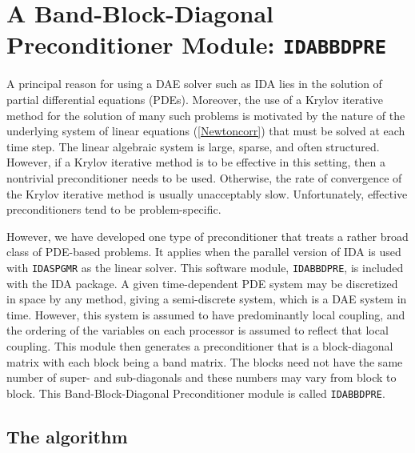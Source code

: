 \section{A Band-Block-Diagonal Preconditioner Module: {\tt IDABBDPRE}}

A principal reason for using a DAE solver such as IDA lies in the
solution of partial differential equations (PDEs).  Moreover, the use
of a Krylov iterative method for the solution of many such problems is
motivated by the nature of the underlying system of linear equations
(\ref{Newtoncorr}) that must be solved at each time step.  The linear
algebraic system is large, sparse, and often structured. However, if a
Krylov iterative method is to be effective in this setting, then a
nontrivial preconditioner needs to be used.  Otherwise, the rate of
convergence of the Krylov iterative method is usually unacceptably
slow.  Unfortunately, effective preconditioners tend to be
problem-specific.

However, we have developed one type of preconditioner that treats a
rather broad class of PDE-based problems.  It applies when the
parallel version of IDA is used with {\tt IDASPGMR} as the linear
solver. This software module, {\tt IDABBDPRE}, is included with the IDA 
package. A given time-dependent PDE system may be discretized in space by any
method, giving a semi-discrete system, which is a DAE system in time.
However, this system is assumed to have predominantly local coupling,
and the ordering of the variables on each processor is assumed to
reflect that local coupling.  This module then generates a
preconditioner that is a block-diagonal matrix with each block being a
band matrix. The blocks need not have the same number of super- and
sub-diagonals and these numbers may vary from block to block. This
Band-Block-Diagonal Preconditioner module is called {\tt IDABBDPRE}.


\subsection{The algorithm}

